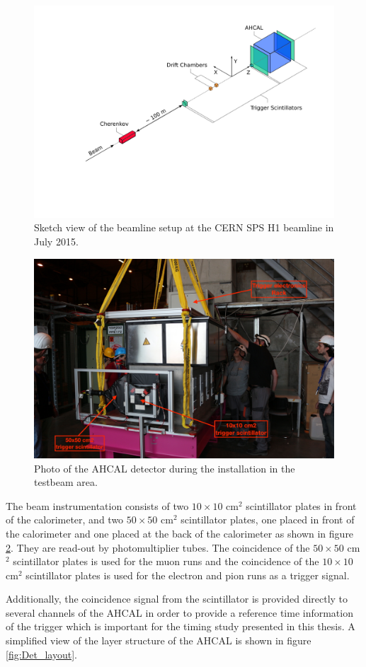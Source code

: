 \begin{figure}[htbp!]
	\centering
	\includegraphics[width=0.7\linewidth]{chap5/fig_EnergyCalib/TestbeamSetup.pdf}
	\caption{Sketch view of the beamline setup at the CERN SPS H1 beamline in July 2015.} \label{fig:TestbeamScketch}
\end{figure}

\begin{figure}[htbp!]
	\centering
	\includegraphics[width=0.7\linewidth]{chap5/fig_EnergyCalib/IMG_1170_copy.jpg}
	\caption{Photo of the AHCAL detector during the installation in the testbeam area.} \label{fig:AHCAL_photo}
\end{figure}

The beam instrumentation consists of two $10\times10$ cm$^2$ scintillator plates in front of the calorimeter, and two $50\times50$ cm$^2$ scintillator plates, one placed in front of the calorimeter and one placed at the back of the calorimeter as shown in figure \ref{fig:AHCAL_photo}. They are read-out by photomultiplier tubes. The coincidence of the $50\times50$ cm$^2$ scintillator plates is used for the muon runs and the coincidence of the $10\times10$ cm$^2$ scintillator plates is used for the electron and pion runs as a trigger signal.

Additionally, the coincidence signal from the scintillator is provided directly to several channels of the AHCAL in order to provide a reference time information of the trigger which is important for the timing study presented in this thesis. A simplified view of the layer structure of the AHCAL is shown in figure \ref{fig:Det_layout}.


